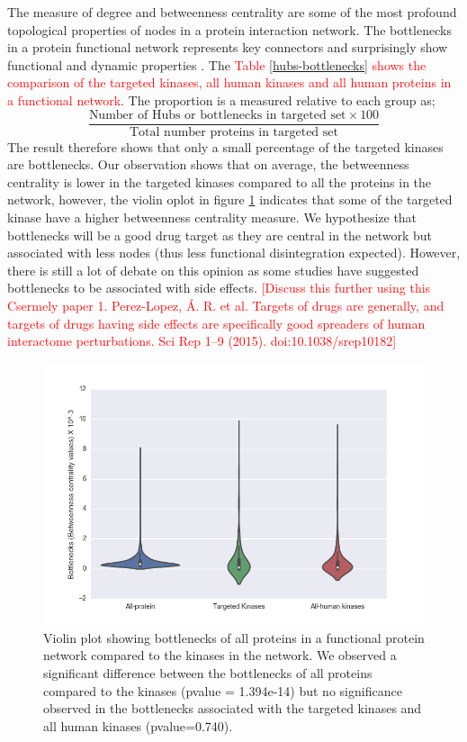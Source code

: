 \documentclass[a4paper, 11pt]{article}
\newcommand{\redcomment}[1]{\textcolor{red}{[#1]}} %
\newcommand{\redinsert}[1]{\textcolor{red}{#1}} %
\begin{document}
The measure of degree and betweenness centrality are some of the most profound topological properties of nodes in a protein interaction network. The bottlenecks in a protein functional network represents key connectors and surprisingly show functional and dynamic properties \cite{yu2007importance}. The \redinsert{Table \ref{hubs-bottlenecks} shows the comparison of the targeted kinases, all human kinases and all human proteins in a functional network}. The proportion is a measured relative to each group as; 
\[
\frac{\text{Number of Hubs or bottlenecks in targeted set} \times100 } {\text{Total number proteins in targeted set}}
\]
The result therefore shows that only a small percentage of the targeted kinases are bottlenecks. Our observation shows that on average, the betweenness centrality is lower in the targeted kinases compared to all the proteins in the network, however, the violin oplot in figure \ref{bottle_measured} indicates that some of the targeted kinase have a higher betweenness centrality measure. We hypothesize that bottlenecks will be a good drug target as they are central in the network but associated with less nodes (thus less functional disintegration expected). However, there is still a lot of debate on this opinion as some studies have suggested bottlenecks to be associated with side effects. \redcomment{Discuss this further using this Csermely paper 1.	Perez-Lopez, Á. R. et al. Targets of drugs are generally, and targets of drugs having side effects are specifically good spreaders of human interactome perturbations. Sci Rep 1–9 (2015). doi:10.1038/srep10182}

\begin{figure}[H]
	\includegraphics[width=.9\linewidth]{figures/bottlenecks_ff2.png}
	\centering
	\caption{Violin plot showing bottlenecks of all proteins in a functional protein network compared to the kinases in the network. We observed a significant difference between the bottlenecks of all proteins compared to the kinases (pvalue = 1.394e-14) but no significance observed in the bottlenecks associated with the targeted kinases and all human kinases (pvalue=0.740).}
	\label{bottle_measured}
\end{figure}
\end{document}
